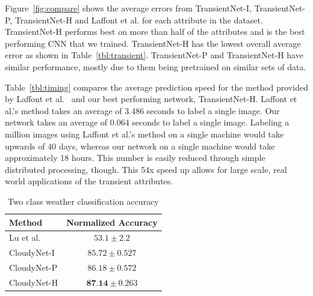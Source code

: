 \documentclass[10pt,twocolumn,letterpaper]{article}
\newcommand{\todo}[1]{\textcolor{red}{todo: {\em #1}}}
\newcommand{\figref}[1]{Figure~\ref{fig:#1}}
\newcommand{\tblref}[1]{Table~\ref{tbl:#1}}
\begin{document}
\figref{compare} shows the average errors from TransientNet-I, TransientNet-P,
TransientNet-H and Laffont et al. for each attribute in the dataset.
TransientNet-H performs best on more than half of the attributes and is the
best performing CNN that we trained.  TransientNet-H has the lowest overall
average error as shown in \tblref{transient}.  TransientNet-P and
TransientNet-H have similar performance, mostly due to them being pretrained on
similar sets of data.

\tblref{timing} compares the average prediction speed for the method provided
by Laffont et al.~\cite{Laffont14} and our best performing network,
TransientNet-H.  Laffont et al.'s method takes an average of 3.486 seconds to
label a single image.  Our network takes an average of 0.064 seconds to label a
single image.  Labeling a million images using Laffont et al.'s method on a
single machine would take upwards of 40 days, whereas our network on a single
machine would take approximately 18 hours. This number is easily reduced
through simple distributed processing, though.  This 54x speed up allows for
large scale, real world applications of the transient attributes.


%

\begin{table}[t]
	\centering
	\caption{Two class weather classification accuracy}
	\begin{tabular}{ | l | c | }
		\hline
			Method & Normalized Accuracy \\ \hline \hline
			Lu et al.~\cite{lutwoclass}& $ 53.1 \pm 2.2 $ \\ \hline
			CloudyNet-I & $ 85.72 \pm 0.527 $ \\ \hline
			CloudyNet-P & $ 86.18 \pm 0.572 $ \\ \hline
			CloudyNet-H & $ \textbf{87.14} \pm 0.263 $ \\ 
		\hline
	\end{tabular}
	\label{tbl:twoclass}
\end{table}
\end{document}
